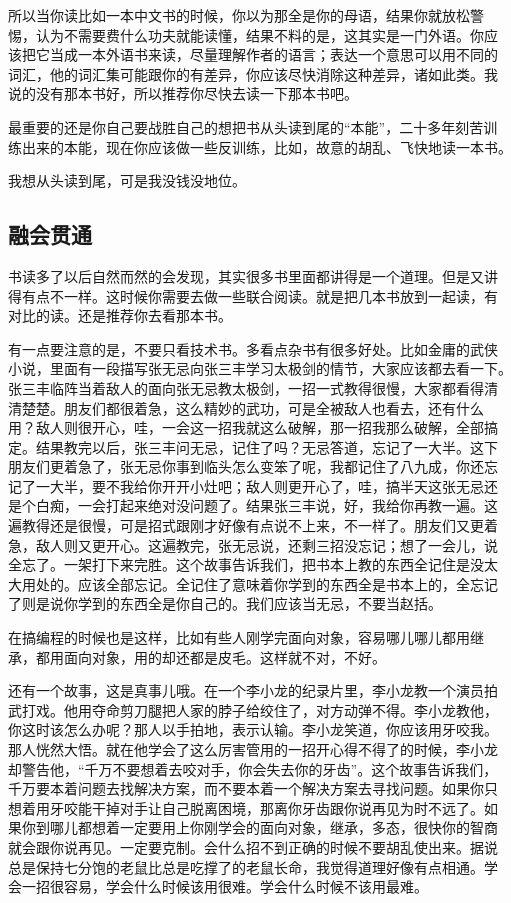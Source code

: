 \documentclass[10pt]{article}
\begin{document}
\begin{CJK*}{UTF8}{simsun}
所以当你读比如一本中文书的时候，你以为那全是你的母语，结果你就放松警
惕，认为不需要费什么功夫就能读懂，结果不料的是，这其实是一门外语。你应
该把它当成一本外语书来读，尽量理解作者的语言；表达一个意思可以用不同的
词汇，他的词汇集可能跟你的有差异，你应该尽快消除这种差异，诸如此类。我
说的没有那本书好，所以推荐你尽快去读一下那本书吧。

最重要的还是你自己要战胜自己的想把书从头读到尾的“本能”，二十多年刻苦训
练出来的本能，现在你应该做一些反训练，比如，故意的胡乱、飞快地读一本书。

我想从头读到尾，可是我没钱没地位。

\subsection{融会贯通}

书读多了以后自然而然的会发现，其实很多书里面都讲得是一个道理。但是又讲
得有点不一样。这时候你需要去做一些联合阅读。就是把几本书放到一起读，有
对比的读。还是推荐你去看那本书。

有一点要注意的是，不要只看技术书。多看点杂书有很多好处。比如金庸的武侠
小说，里面有一段描写张无忌向张三丰学习太极剑的情节，大家应该都去看一下。
张三丰临阵当着敌人的面向张无忌教太极剑，一招一式教得很慢，大家都看得清
清楚楚。朋友们都很着急，这么精妙的武功，可是全被敌人也看去，还有什么
用？敌人则很开心，哇，一会这一招我就这么破解，那一招我那么破解，全部搞
定。结果教完以后，张三丰问无忌，记住了吗？无忌答道，忘记了一大半。这下
朋友们更着急了，张无忌你事到临头怎么变笨了呢，我都记住了八九成，你还忘
记了一大半，要不我给你开开小灶吧；敌人则更开心了，哇，搞半天这张无忌还
是个白痴，一会打起来绝对没问题了。结果张三丰说，好，我给你再教一遍。这
遍教得还是很慢，可是招式跟刚才好像有点说不上来，不一样了。朋友们又更着
急，敌人则又更开心。这遍教完，张无忌说，还剩三招没忘记；想了一会儿，说
全忘了。一架打下来完胜。这个故事告诉我们，把书本上教的东西全记住是没太
大用处的。应该全部忘记。全记住了意味着你学到的东西全是书本上的，全忘记
了则是说你学到的东西全是你自己的。我们应该当无忌，不要当赵括。

在搞编程的时候也是这样，比如有些人刚学完面向对象，容易哪儿哪儿都用继
承，都用面向对象，用的却还都是皮毛。这样就不对，不好。

还有一个故事，这是真事儿哦。在一个李小龙的纪录片里，李小龙教一个演员拍
武打戏。他用夺命剪刀腿把人家的脖子给绞住了，对方动弹不得。李小龙教他，
你这时该怎么办呢？那人以手拍地，表示认输。李小龙笑道，你应该用牙咬我。
那人恍然大悟。就在他学会了这么厉害管用的一招开心得不得了的时候，李小龙
却警告他，“千万不要想着去咬对手，你会失去你的牙齿”。这个故事告诉我们，
千万要本着问题去找解决方案，而不要本着一个解决方案去寻找问题。如果你只
想着用牙咬能干掉对手让自己脱离困境，那离你牙齿跟你说再见为时不远了。如
果你到哪儿都想着一定要用上你刚学会的面向对象，继承，多态，很快你的智商
就会跟你说再见。一定要克制。会什么招不到正确的时候不要胡乱使出来。据说
总是保持七分饱的老鼠比总是吃撑了的老鼠长命，我觉得道理好像有点相通。学
会一招很容易，学会什么时候该用很难。学会什么时候不该用最难。


\end{CJK*}
\end{document}
